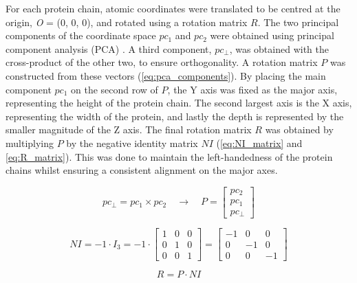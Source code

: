For each protein chain, atomic coordinates were translated to be centred at the origin, \textit{O} = (0, 0, 0), and rotated using a rotation matrix $R$. The two principal components of the coordinate space $pc_{1}$ and $pc_{2}$ were obtained using principal component analysis (PCA) \cite{HOTELLING_1933_PCA}. A third component, $pc_{\perp}$, was obtained with the cross-product of the other two, to ensure orthogonality. A rotation matrix $P$ was constructed from these vectors (\autoref{eq:pca_components}). By placing the main component $pc_{1}$ on the second row of $P$, the Y axis was fixed as the major axis, representing the height of the protein chain. The second largest axis is the X axis, representing the width of the protein, and lastly the depth is represented by the smaller magnitude of the Z axis. The final rotation matrix $R$ was obtained by multiplying $P$ by the negative identity matrix $NI$ (\autoref{eq:NI_matrix} and \autoref{eq:R_matrix}). This was done to maintain the left-handedness of the protein chains whilst ensuring a consistent alignment on the major axes.

\begin{equation}
pc_{\perp} = pc_{1} \times pc_{2} \quad \rightarrow \quad P = \begin{bmatrix}
pc_{2} \\
pc_{1} \\
pc_{\perp}
\end{bmatrix}
\label{eq:pca_components}
\end{equation}

\begin{equation}
NI = -1 \cdot I_3 = -1 \cdot \begin{bmatrix}
1 & 0 & 0 \\
0 & 1 & 0 \\
0 & 0 & 1 
\end{bmatrix} = \begin{bmatrix}
-1 & 0 & 0 \\
0 & -1 & 0 \\
0 & 0 & -1 
\end{bmatrix}
\label{eq:NI_matrix}
\end{equation}

\begin{equation}
R = P \cdot NI
\label{eq:R_matrix}
\end{equation}

\vspace{-12pt} %
\vspace{-12pt} %
\vspace{-12pt} %

